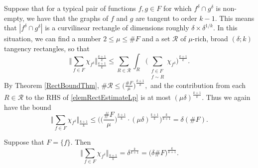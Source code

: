 \documentclass[letterpaper, reqno,11pt]{article}
\numberwithin{equation}{section}
\numberwithin{thm}{section}
\theoremstyle{remark}
\begin{document}
 Suppose that for a typical pair of functions $f,g\in F$ for which $f^\delta \cap g^\delta$ is non-empty, we have that the graphs of $f$ and $g$ are tangent to order $k-1$. This means that $|f^\delta\cap g^\delta|$ is a curvilinear rectangle of dimensions roughly $\delta\times\delta^{1/k}$. In this situation, we can find a number $2\leq\mu\leq\#F$ and a set $\mathcal{R}$ of $\mu$-rich, broad $(\delta;k)$ tangency rectangles, so that 
\begin{equation}\label{elemRectEstimateLp}
\Big\Vert \sum_{f\in F} \chi_{f^\delta} \Big\Vert_{\frac{k+1}{k}}^{\frac{k+1}{k}} 
\leq \sum_{R\in\mathcal{R} }\int_R \Big(\sum_{\substack{f\in F\\ f\sim R}}\chi_{f^\delta}\Big)^{\frac{k+1}{k}}.
\end{equation}
By Theorem \ref{RectBoundThm}, $\#\mathcal{R}\leq  \big(\frac{\#F}{\mu}\big)^{\frac{k+1}{k}},$ and the contribution from each $R\in\mathcal{R}$ to the RHS of \eqref{elemRectEstimateLp} is at most $(\mu\delta)^{\frac{k+1}{k}}$. Thus we again have the bound
\begin{equation}\label{arrangement2Bd}
\Big\Vert \sum_{f\in F} \chi_{f^\delta} \Big\Vert_{\frac{k+1}{k}} \leq \Big(\big(\frac{\#F}{\mu}\big)^{\frac{k+1}{k}} \cdot (\mu\delta)^{\frac{k+1}{k}}\Big)^{\frac{k}{k+1}}= \delta(\#F).
\end{equation}


\medskip

 Suppose that $F=\{f\}$. Then
\[
\Big\Vert \sum_{f\in F} \chi_{f^\delta} \Big\Vert_{\frac{k+1}{k}} = \delta^{\frac{k}{k+1}} = \big(\delta \#F\big)^{\frac{k}{k+1}}.
\]

\medskip
\end{document}
